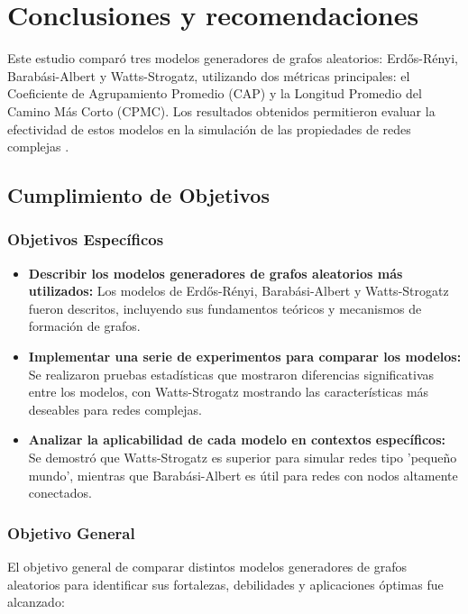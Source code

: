 \chapter{Conclusiones y recomendaciones}

Este estudio comparó tres modelos generadores de grafos aleatorios: Erdős-Rényi, Barabási-Albert y Watts-Strogatz, utilizando dos métricas principales: el Coeficiente de Agrupamiento Promedio (CAP) y la Longitud Promedio del Camino Más Corto (CPMC). Los resultados obtenidos permitieron evaluar la efectividad de estos modelos en la simulación de las propiedades de redes complejas .

\section{Cumplimiento de Objetivos}

\subsection{Objetivos Específicos}

\begin{itemize}
    \item \textbf{Describir los modelos generadores de grafos aleatorios más utilizados:} Los modelos de Erdős-Rényi, Barabási-Albert y Watts-Strogatz fueron descritos, incluyendo sus fundamentos teóricos y mecanismos de formación de grafos.
    \item \textbf{Implementar una serie de experimentos para comparar los modelos:} Se realizaron pruebas estadísticas que mostraron diferencias significativas entre los modelos, con Watts-Strogatz mostrando las características más deseables para redes complejas.
    \item \textbf{Analizar la aplicabilidad de cada modelo en contextos específicos:} Se demostró que Watts-Strogatz es superior para simular redes tipo 'pequeño mundo', mientras que Barabási-Albert es útil para redes con nodos altamente conectados.
\end{itemize}

\subsection{Objetivo General}

El objetivo general de comparar distintos modelos generadores de grafos aleatorios para identificar sus fortalezas, debilidades y aplicaciones óptimas fue alcanzado:

